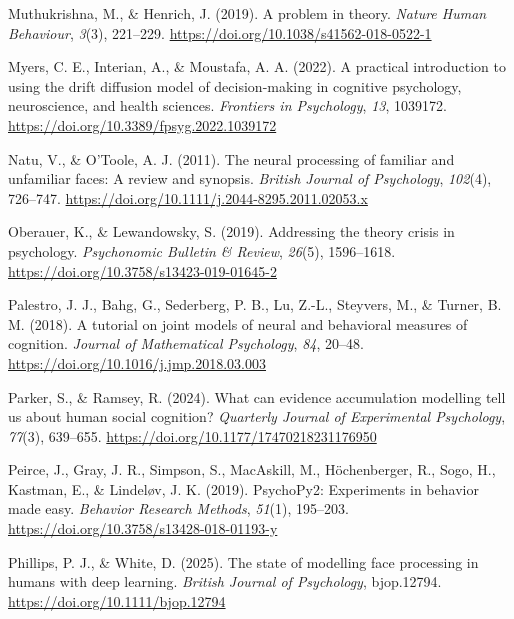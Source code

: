 \documentclass[
  letterpaper,
  DIV=11,
  numbers=noendperiod]{scrartcl}
\newlength{\cslhangindent}
\newenvironment{CSLReferences}[2] %
 {\begin{list}{}{%
  \setlength{\itemindent}{0pt}
  \setlength{\leftmargin}{0pt}
  \setlength{\parsep}{0pt}
  \ifodd #1
   \setlength{\leftmargin}{\cslhangindent}
   \setlength{\itemindent}{-1\cslhangindent}
  \fi
  \setlength{\itemsep}{#2\baselineskip}}}
 {\end{list}}
\begin{document}
\begin{CSLReferences}{1}{0}
Muthukrishna, M., \& Henrich, J. (2019). A problem in theory.
\emph{Nature Human Behaviour}, \emph{3}(3), 221--229.
\url{https://doi.org/10.1038/s41562-018-0522-1}

Myers, C. E., Interian, A., \& Moustafa, A. A. (2022). A practical
introduction to using the drift diffusion model of decision-making in
cognitive psychology, neuroscience, and health sciences. \emph{Frontiers
in Psychology}, \emph{13}, 1039172.
\url{https://doi.org/10.3389/fpsyg.2022.1039172}

Natu, V., \& O'Toole, A. J. (2011). The neural processing of familiar
and unfamiliar faces: A review and synopsis. \emph{British Journal of
Psychology}, \emph{102}(4), 726--747.
\url{https://doi.org/10.1111/j.2044-8295.2011.02053.x}

Oberauer, K., \& Lewandowsky, S. (2019). Addressing the theory crisis in
psychology. \emph{Psychonomic Bulletin \& Review}, \emph{26}(5),
1596--1618. \url{https://doi.org/10.3758/s13423-019-01645-2}

Palestro, J. J., Bahg, G., Sederberg, P. B., Lu, Z.-L., Steyvers, M., \&
Turner, B. M. (2018). A tutorial on joint models of neural and
behavioral measures of cognition. \emph{Journal of Mathematical
Psychology}, \emph{84}, 20--48.
\url{https://doi.org/10.1016/j.jmp.2018.03.003}

Parker, S., \& Ramsey, R. (2024). What can evidence accumulation
modelling tell us about human social cognition? \emph{Quarterly Journal
of Experimental Psychology}, \emph{77}(3), 639--655.
\url{https://doi.org/10.1177/17470218231176950}

Peirce, J., Gray, J. R., Simpson, S., MacAskill, M., Höchenberger, R.,
Sogo, H., Kastman, E., \& Lindeløv, J. K. (2019). PsychoPy2: Experiments
in behavior made easy. \emph{Behavior Research Methods}, \emph{51}(1),
195--203. \url{https://doi.org/10.3758/s13428-018-01193-y}

Phillips, P. J., \& White, D. (2025). The state of modelling face
processing in humans with deep learning. \emph{British Journal of
Psychology}, bjop.12794. \url{https://doi.org/10.1111/bjop.12794}


\end{CSLReferences}
\end{document}
